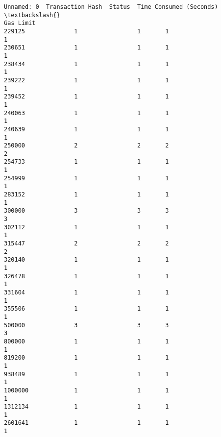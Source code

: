 \documentclass[11pt]{article}
\begin{document}
    \begin{Verbatim}[commandchars=\\\{\}]
           Unnamed: 0  Transaction Hash  Status  Time Consumed (Seconds)  \textbackslash{}
Gas Limit                                                                  
229125              1                 1       1                        1   
230651              1                 1       1                        1   
238434              1                 1       1                        1   
239222              1                 1       1                        1   
239452              1                 1       1                        1   
240063              1                 1       1                        1   
240639              1                 1       1                        1   
250000              2                 2       2                        2   
254733              1                 1       1                        1   
254999              1                 1       1                        1   
283152              1                 1       1                        1   
300000              3                 3       3                        3   
302112              1                 1       1                        1   
315447              2                 2       2                        2   
320140              1                 1       1                        1   
326478              1                 1       1                        1   
331604              1                 1       1                        1   
355506              1                 1       1                        1   
500000              3                 3       3                        3   
800000              1                 1       1                        1   
819200              1                 1       1                        1   
938489              1                 1       1                        1   
1000000             1                 1       1                        1   
1312134             1                 1       1                        1   
2601641             1                 1       1                        1   


\end{Verbatim}
\end{document}
